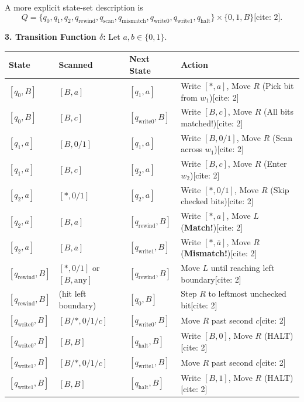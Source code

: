\documentclass[11pt,a4paper]{article}
\begin{document}
\begin{solutionbox}
A more explicit state-set description is
$$Q = \{q_0,q_1,q_2,q_{\text{rewind}},q_{\text{scan}},q_{\text{mismatch}},q_{\text{write0}},q_{\text{write1}},q_{\text{halt}}\}\times\{0,1,B\}\text{[cite: 2]}.$$

\textbf{3. Transition Function $\delta$:} Let $a, b \in \{0, 1\}$.
\begin{center}
\small
\begin{tabular}{llll}
\toprule
\textbf{State} & \textbf{Scanned} & \textbf{Next State} & \textbf{Action} \\
\midrule
$[q_0, B]$ & $[B, a]$ & $[q_1, a]$ & Write $[*, a]$, Move $R$ (Pick bit from $w_1$)[cite: 2] \\
$[q_0, B]$ & $[B, c]$ & $[q_{\text{write0}}, B]$ & Write $[B, c]$, Move $R$ (All bits matched!)[cite: 2] \\
$[q_1, a]$ & $[B, 0/1]$ & $[q_1, a]$ & Write $[B, 0/1]$, Move $R$ (Scan across $w_1$)[cite: 2] \\
$[q_1, a]$ & $[B, c]$ & $[q_2, a]$ & Write $[B, c]$, Move $R$ (Enter $w_2$)[cite: 2] \\
$[q_2, a]$ & $[*, 0/1]$ & $[q_2, a]$ & Write $[*, 0/1]$, Move $R$ (Skip checked bits)[cite: 2] \\
$[q_2, a]$ & $[B, a]$ & $[q_{\text{rewind}}, B]$ & Write $[*, a]$, Move $L$ (\textbf{Match!})[cite: 2] \\
$[q_2, a]$ & $[B, \bar{a}]$ & $[q_{\text{write1}}, B]$ & Write $[*, \bar{a}]$, Move $R$ (\textbf{Mismatch!})[cite: 2] \\
$[q_{\text{rewind}}, B]$ & $[*, 0/1]$ or $[B, \text{any}]$ & $[q_{\text{rewind}}, B]$ & Move $L$ until reaching left boundary[cite: 2] \\
$[q_{\text{rewind}}, B]$ & (hit left boundary) & $[q_0, B]$ & Step $R$ to leftmost unchecked bit[cite: 2] \\
$[q_{\text{write0}}, B]$ & $[B/*, 0/1/c]$ & $[q_{\text{write0}}, B]$ & Move $R$ past second $c$[cite: 2] \\
$[q_{\text{write0}}, B]$ & $[B, B]$ & $[q_{\text{halt}}, B]$ & Write $[B, 0]$, Move $R$ (HALT)[cite: 2] \\
$[q_{\text{write1}}, B]$ & $[B/*, 0/1/c]$ & $[q_{\text{write1}}, B]$ & Move $R$ past second $c$[cite: 2] \\
$[q_{\text{write1}}, B]$ & $[B, B]$ & $[q_{\text{halt}}, B]$ & Write $[B, 1]$, Move $R$ (HALT)[cite: 2] \\
\bottomrule
\end{tabular}
\end{center}


\end{solutionbox}
\end{document}
